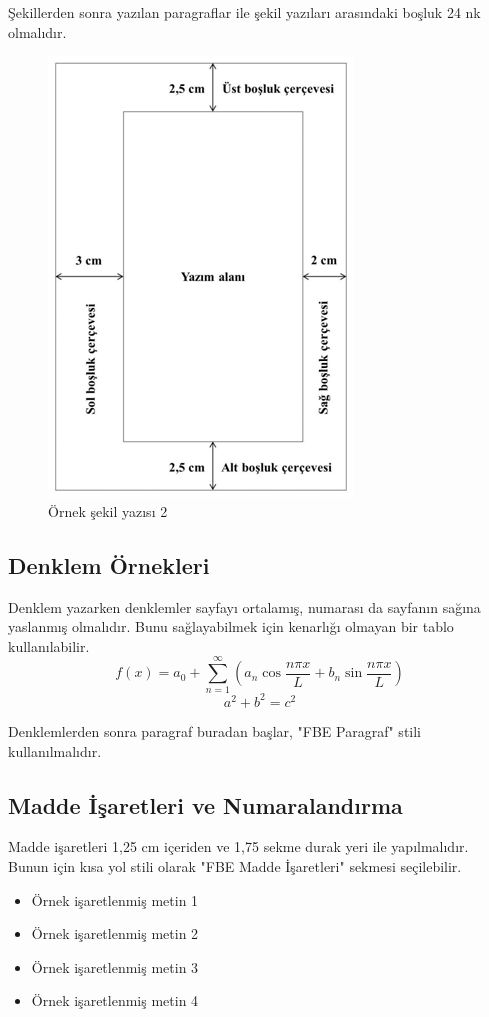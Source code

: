 Şekillerden sonra yazılan paragraflar ile şekil yazıları arasındaki boşluk 24 nk olmalıdır. 

\begin{figure}
	\includegraphics[width=0.2\linewidth]{sekiller/sekil}
	\caption{Örnek şekil yazısı 2}
	\label{fig:sekil}
	\vspace{24pt}
\end{figure}

\subsection{Denklem Örnekleri}
\noindent Denklem yazarken denklemler sayfayı ortalamış, numarası da sayfanın sağına yaslanmış olmalıdır. Bunu sağlayabilmek için kenarlığı olmayan bir tablo kullanılabilir.
\begin{equation}
f(x)=a_0+\sum_{n=1}^{\infty}\left(a_n\cos\frac{n\pi x}{L}+b_n\sin\frac{n\pi x}{L}\right)
\end{equation}
\begin{equation}
a^2+b^2=c^2
\end{equation}

Denklemlerden sonra paragraf buradan başlar, "FBE Paragraf" stili kullanılmalıdır.






\subsection{Madde İşaretleri ve Numaralandırma}
\noindent Madde işaretleri 1,25 cm içeriden ve 1,75 sekme durak yeri ile yapılmalıdır. Bunun için kısa yol stili olarak "FBE Madde İşaretleri" sekmesi seçilebilir.
\begin{itemize}
	\setlength{\itemindent}{1.25cm}
	\item Örnek işaretlenmiş metin 1
    \item Örnek işaretlenmiş metin 2
     \item Örnek işaretlenmiş metin 3
     \item Örnek işaretlenmiş metin 4
\end{itemize}

